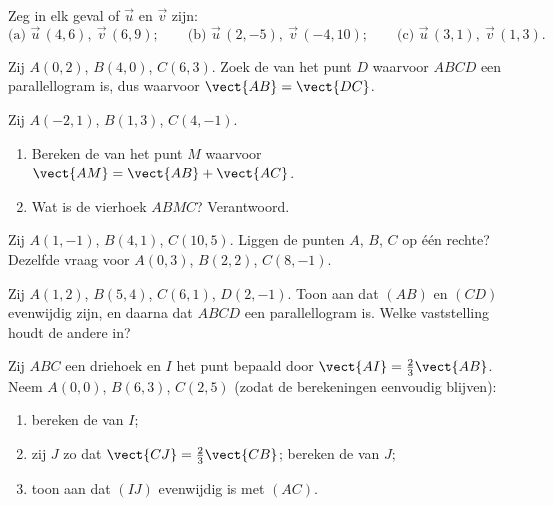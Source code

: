 \begin{exercise}[$\star$]\label{exo:g10:vectors:4}
Zeg in elk geval of $\vec u$ en $\vec v$  zijn:
\[
\text{(a) } \vec u\,(4, 6),\ \vec v\,(6, 9);
\qquad
\text{(b) } \vec u\,(2, -5),\ \vec v\,(-4, 10);
\qquad
\text{(c) } \vec u\,(3, 1),\ \vec v\,(1, 3).
\]
\end{exercise}

\begin{exercise}[$\star$]\label{exo:g10:vectors:5}
Zij $A(0, 2)$, $B(4, 0)$, $C(6, 3)$. Zoek de  van het punt $D$
waarvoor $ABCD$ een parallellogram is, dus waarvoor
$\vect{AB} = \vect{DC}$.
\end{exercise}

\begin{exercise}[$\star\star$]\label{exo:g10:vectors:6}
Zij $A(-2, 1)$, $B(1, 3)$, $C(4, -1)$.
\begin{enumerate}
  \item Bereken de  van het punt $M$ waarvoor
        $\vect{AM} = \vect{AB} + \vect{AC}$.
  \item Wat is de vierhoek $ABMC$? Verantwoord.
\end{enumerate}
\end{exercise}

\begin{exercise}[$\star\star$]\label{exo:g10:vectors:7}
Zij $A(1, -1)$, $B(4, 1)$, $C(10, 5)$. Liggen de punten $A$, $B$, $C$ op één
rechte? Dezelfde vraag voor $A(0, 3)$, $B(2, 2)$, $C(8, -1)$.
\end{exercise}

\begin{exercise}[$\star\star$]\label{exo:g10:vectors:8}
Zij $A(1, 2)$, $B(5, 4)$, $C(6, 1)$, $D(2, -1)$. Toon aan dat $(AB)$ en
$(CD)$ evenwijdig zijn, en daarna dat $ABCD$ een parallellogram is. Welke
vaststelling houdt de andere in?
\end{exercise}

\begin{exercise}[$\star\star$]\label{exo:g10:vectors:9}
Zij $ABC$ een driehoek en $I$ het punt bepaald door
$\vect{AI} = \frac23 \vect{AB}$. Neem $A(0,0)$, $B(6, 3)$, $C(2, 5)$ (zodat
de berekeningen eenvoudig blijven):
\begin{enumerate}
  \item bereken de  van $I$;
  \item zij $J$ zo dat $\vect{CJ} = \frac23\vect{CB}$; bereken de 
        van $J$;
  \item toon aan dat $(IJ)$ evenwijdig is met $(AC)$.
\end{enumerate}
\end{exercise}

